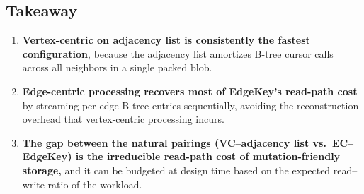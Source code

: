 \subsection{Takeaway}

\begin{enumerate}
  \item \textbf{Vertex-centric on adjacency list is consistently the fastest configuration}, because the adjacency list amortizes B-tree cursor calls across all neighbors in a single packed blob.

  \item \textbf{Edge-centric processing recovers most of EdgeKey's read-path cost} by streaming per-edge B-tree entries sequentially, avoiding the reconstruction overhead that vertex-centric processing incurs.

  \item \textbf{The gap between the natural pairings (VC--adjacency list vs.\ EC--EdgeKey) is the irreducible read-path cost of mutation-friendly storage,} and it can be budgeted at design time based on the expected read--write ratio of the workload.
\end{enumerate}

